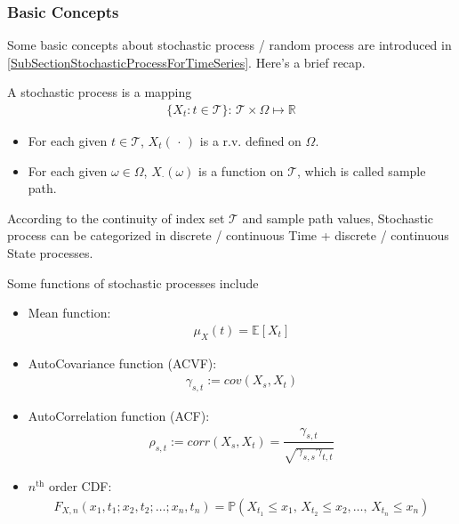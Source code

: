 \subsubsection{Basic Concepts}
Some basic concepts about stochastic process / random process are introduced in \autoref{SubSectionStochasticProcessForTimeSeries}. Here's a brief recap.

A stochastic process is a mapping
\begin{align*}
     \{X_t:t\in\mathcal{T}\}:\, \mathcal{T}\times\Omega \mapsto \mathbb{R}
\end{align*}

\begin{itemize}[topsep=2pt,itemsep=0pt]
    \item For each given $ t \in\mathcal{T}$, $ X_t(\, \cdot \, ) $ is a r.v. defined on $ \Omega  $.
    \item For each given $ \omega \in \Omega  $, $ X_\cdot (\omega ) $ is a function on $ \mathcal{T} $, which is called sample path.
\end{itemize}

According to the continuity of index set $ \mathcal{T} $ and sample path values, Stochastic process can be categorized in discrete / continuous Time + discrete / continuous State processes.

Some functions of stochastic processes include
\begin{itemize}[topsep=2pt,itemsep=0pt]
    \item Mean function:
    \begin{align*}
        \mu _X(t)=\mathbb{E}\left[ X_t \right]  
    \end{align*}
    \item AutoCovariance function (ACVF):
    \begin{align*}
        \gamma _{s,t}:=cov(X_s,X_t)
    \end{align*}
    \item AutoCorrelation function (ACF):
    \begin{align*}
        \rho _{s,t}:=corr(X_s,X_t)=\dfrac{\gamma _{s,t}}{\sqrt{\gamma _{s,s}\gamma _{t,t}}} 
    \end{align*}
    \item $ n^\mathrm{th}  $ order CDF:
    \begin{align*}
        F_{X,n}(x_1,t_1;x_2,t_2;\ldots;x_n,t_n)=\mathbb{P}\left( X_{t_1}\leq x_1,\,X_{t_2}\leq x_2,\ldots,\,X_{t_n}\leq x_n \right)  
    \end{align*}
   
\end{itemize}

